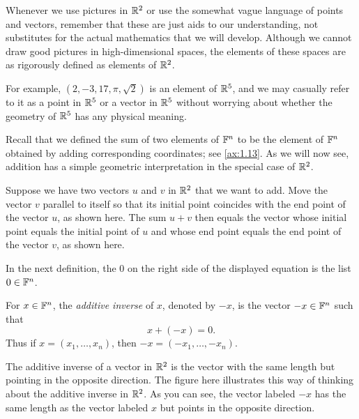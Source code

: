 %
Whenever we use pictures in $\mathbb{R}^2$ or use the somewhat vague language of points
and vectors, remember that these are just aids to our understanding, not
substitutes for the actual mathematics that we will develop. Although we cannot
draw good pictures in high-dimensional spaces, the elements of these spaces are
as rigorously defined as elements of $\mathbb{R}^2$.

For example, $(2,-3,17,\pi,\sqrt2)$ is an element of $\mathbb{R}^5$, and we may
casually refer to it as a point in $\mathbb{R}^5$ or a vector in $\mathbb{R}^5$ without
worrying about whether the geometry of $\mathbb{R}^5$ has any physical meaning.

Recall that we defined the sum of two elements of $\mathbb{F}^n$ to be the element of
$\mathbb{F}^n$ obtained by adding corresponding coordinates; see \ref{ax:1.13}. As we
will now see, addition has a simple geometric interpretation in the special
case of $\mathbb{R}^2$.

%
Suppose we have two vectors $u$ and $v$ in $\mathbb{R}^2$ that we want to add. Move the
vector $v$ parallel to itself so that its initial point coincides with the end
point of the vector $u$, as shown here. The sum $u+v$ then equals the vector
whose initial point equals the initial point of $u$ and whose end point equals
the end point of the vector $v$, as shown here.

In the next definition, the $0$ on the right side of the displayed equation is
the list $0\in\mathbb{F}^n$.

\begin{definition}\label{ax:1.17}
For $x\in\mathbb{F}^n$, the \emph{additive inverse} of $x$, denoted by $-x$, is the
vector $-x\in\mathbb{F}^n$ such that
\[ x+(-x)=0. \]
Thus if $x=(x_1,\dots,x_n)$, then $-x=(-x_1,\dots,-x_n)$.
\end{definition}

%
The additive inverse of a vector in $\mathbb{R}^2$ is the vector with the same length
but pointing in the opposite direction. The figure here illustrates this way of
thinking about the additive inverse in $\mathbb{R}^2$. As you can see, the vector
labeled $-x$ has the same length as the vector labeled $x$ but points in the
opposite direction.

